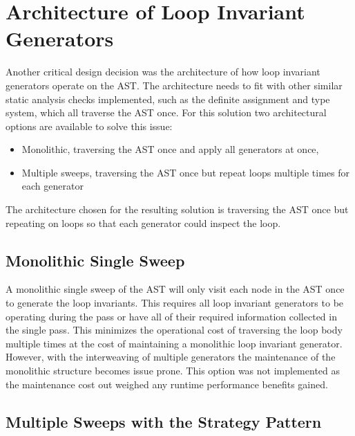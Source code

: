 \section{Architecture of Loop Invariant Generators}

Another critical design decision was the architecture of how loop invariant
generators operate on the AST. 
The architecture needs to fit with other similar static analysis checks
implemented, such as the definite assignment and type system, which all
traverse the AST once.
For this solution two architectural options are available to solve this issue:

\begin{itemize}
    \item{Monolithic, traversing the AST once and apply all generators at once,}
    \item{Multiple sweeps, traversing the AST once but repeat loops multiple times for each generator}
\end{itemize}

The architecture chosen for the resulting solution is  traversing the AST once
but repeating on loops so that each generator could inspect the loop.

\subsection{Monolithic Single Sweep}

A monolithic single sweep of the AST will only visit each
node in the AST once to generate the loop invariants.
This requires all loop invariant generators to be operating
during the pass or have all of their required information collected
in the single pass.
This minimizes the operational cost of traversing the loop body
multiple times at the cost of maintaining a monolithic loop invariant generator.
However, with the interweaving of multiple generators the maintenance of the
monolithic structure becomes issue prone.
This option was not implemented as the maintenance cost out weighed any
runtime performance benefits gained.



\subsection{Multiple Sweeps with the Strategy Pattern}

